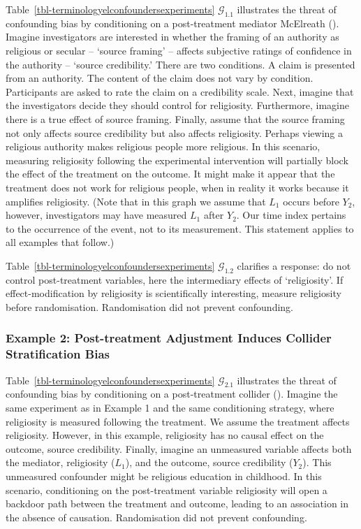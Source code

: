 \documentclass[
  single column]{article}
\begin{document}
Table~\ref{tbl-terminologyelconfoundersexperiments}
\(\mathcal{G}_{1.1}\) illustrates the threat of confounding bias by
conditioning on a post-treatment mediator McElreath
(). Imagine investigators are
interested in whether the framing of an authority as religious or
secular -- `source framing' -- affects subjective ratings of confidence
in the authority -- `source credibility.' There are two conditions. A
claim is presented from an authority. The content of the claim does not
vary by condition. Participants are asked to rate the claim on a
credibility scale. Next, imagine that the investigators decide they
should control for religiosity. Furthermore, imagine there is a true
effect of source framing. Finally, assume that the source framing not
only affects source credibility but also affects religiosity. Perhaps
viewing a religious authority makes religious people more religious. In
this scenario, measuring religiosity following the experimental
intervention will partially block the effect of the treatment on the
outcome. It might make it appear that the treatment does not work for
religious people, when in reality it works because it amplifies
religiosity. (Note that in this graph we assume that \(L_1\) occurs
before \(Y_2\), however, investigators may have measured \(L_1\) after
\(Y_2\). Our time index pertains to the occurrence of the event, not to
its measurement. This statement applies to all examples that follow.)

Table~\ref{tbl-terminologyelconfoundersexperiments}
\(\mathcal{G}_{1.2}\) clarifies a response: do not control
post-treatment variables, here the intermediary effects of
`religiosity'. If effect-modification by religiosity is scientifically
interesting, measure religiosity before randomisation. Randomisation did
not prevent confounding.

\subsubsection{Example 2: Post-treatment Adjustment Induces Collider
Stratification
Bias}\label{example-2-post-treatment-adjustment-induces-collider-stratification-bias}

Table~\ref{tbl-terminologyelconfoundersexperiments}
\(\mathcal{G}_{2.1}\) illustrates the threat of confounding bias by
conditioning on a post-treatment collider (). Imagine the same experiment as in Example 1 and
the same conditioning strategy, where religiosity is measured following
the treatment. We assume the treatment affects religiosity. However, in
this example, religiosity has no causal effect on the outcome, source
credibility. Finally, imagine an unmeasured variable affects both the
mediator, religiosity (\(L_1\)), and the outcome, source credibility
(\(Y_2\)). This unmeasured confounder might be religious education in
childhood. In this scenario, conditioning on the post-treatment variable
religiosity will open a backdoor path between the treatment and outcome,
leading to an association in the absence of causation. Randomisation did
not prevent confounding.
\end{document}
